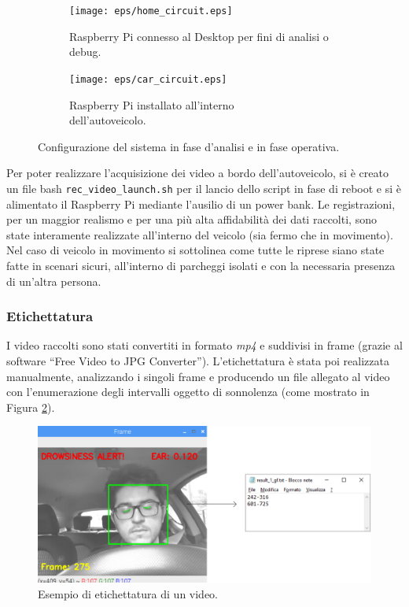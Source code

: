 \documentclass[12pt]{article}
\newcommand{\quotes}[1]{``#1''}
\begin{document}
\begin{figure}[!htb]
	\begin{subfigure}{.45\textwidth}
		\centering
		\texttt{[image: eps/home\_circuit.eps]}
		\caption{Raspberry Pi connesso al Desktop per fini di analisi o debug.}
	\end{subfigure}
	\hspace{5mm}
	\begin{subfigure}{.55\textwidth}
		\centering
		\texttt{[image: eps/car\_circuit.eps]}
		\caption{Raspberry Pi installato all'interno\\dell'autoveicolo.}
	\end{subfigure}
	\caption{Configurazione del sistema in fase d'analisi e in fase operativa.}
	\label{fig:system_uses}
\end{figure}

Per poter realizzare l'acquisizione dei video a bordo dell'autoveicolo, si è creato un file bash \texttt{rec\_video\_launch.sh} per il lancio dello script in fase di reboot e si è alimentato il Raspberry Pi mediante l'ausilio di un power bank. Le registrazioni, per un maggior realismo e per una più alta affidabilità dei dati raccolti, sono state interamente realizzate all'interno del veicolo (sia fermo che in movimento). Nel caso di veicolo in movimento si sottolinea come tutte le riprese siano state fatte in scenari sicuri, all'interno di parcheggi isolati e con la necessaria presenza di un'altra persona. 

\subsubsection{Etichettatura}
I video raccolti sono stati convertiti in formato \textit{mp4} e suddivisi in frame (grazie al software \quotes{Free Video to JPG Converter}\cite{FrameExtraction}). L'etichettatura è stata poi realizzata manualmente, analizzando i singoli frame e producendo un file allegato al video con l'enumerazione degli intervalli oggetto di sonnolenza (come mostrato in Figura \ref{fig:video_label}).

\begin{figure}[!htb]
	\centering
	\includegraphics[scale=0.45]{eps/result_1_gf.eps}
	\caption{Esempio di etichettatura di un video.}
	\label{fig:video_label}
\end{figure}
\end{document}
